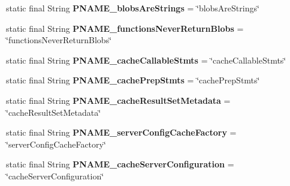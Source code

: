 \begin{DoxyCompactItemize}
static final String {\bfseries P\+N\+A\+M\+E\+\_\+blobs\+Are\+Strings} = \char`\"{}blobs\+Are\+Strings\char`\"{}
\item 
\mbox{\label{classcom_1_1mysql_1_1cj_1_1conf_1_1_property_definitions_a8d9cf04fa7d305d5f658b015229a9219}} 
static final String {\bfseries P\+N\+A\+M\+E\+\_\+functions\+Never\+Return\+Blobs} = \char`\"{}functions\+Never\+Return\+Blobs\char`\"{}
\item 
\mbox{\label{classcom_1_1mysql_1_1cj_1_1conf_1_1_property_definitions_aef6806c452cecba607f993d926dd99ed}} 
static final String {\bfseries P\+N\+A\+M\+E\+\_\+cache\+Callable\+Stmts} = \char`\"{}cache\+Callable\+Stmts\char`\"{}
\item 
\mbox{\label{classcom_1_1mysql_1_1cj_1_1conf_1_1_property_definitions_a30d51d6f72cd1b284f53b95b40937feb}} 
static final String {\bfseries P\+N\+A\+M\+E\+\_\+cache\+Prep\+Stmts} = \char`\"{}cache\+Prep\+Stmts\char`\"{}
\item 
\mbox{\label{classcom_1_1mysql_1_1cj_1_1conf_1_1_property_definitions_a324129a30cc11128fe5597e7513b22e7}} 
static final String {\bfseries P\+N\+A\+M\+E\+\_\+cache\+Result\+Set\+Metadata} = \char`\"{}cache\+Result\+Set\+Metadata\char`\"{}
\item 
\mbox{\label{classcom_1_1mysql_1_1cj_1_1conf_1_1_property_definitions_abdde517ac3034e4ca1d6a8c1d4f5b247}} 
static final String {\bfseries P\+N\+A\+M\+E\+\_\+server\+Config\+Cache\+Factory} = \char`\"{}server\+Config\+Cache\+Factory\char`\"{}
\item 
\mbox{\label{classcom_1_1mysql_1_1cj_1_1conf_1_1_property_definitions_ad55cd0e317a487dfdcac399fb3d946eb}} 
static final String {\bfseries P\+N\+A\+M\+E\+\_\+cache\+Server\+Configuration} = \char`\"{}cache\+Server\+Configuration\char`\"{}
\item 
\mbox{\label{classcom_1_1mysql_1_1cj_1_1conf_1_1_property_definitions_a367a64bd823345bf89867ecc93e72695}} 

\end{DoxyCompactItemize}
